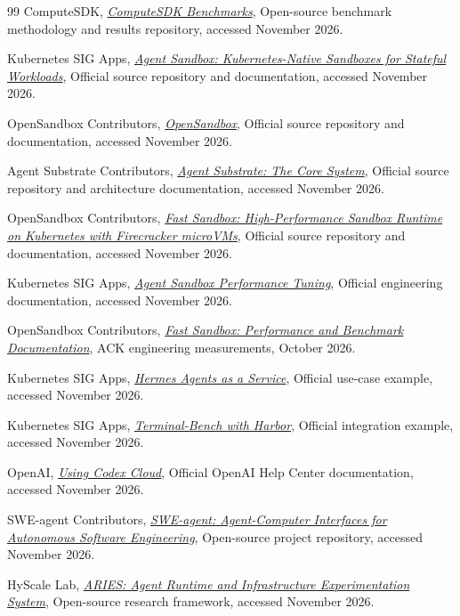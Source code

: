 \documentclass[
  a4paper,
]{article}
\begin{document}
\begin{thebibliography}{99}
ComputeSDK,
\emph{\href{https://github.com/computesdk/benchmarks}
{ComputeSDK Benchmarks}},
Open-source benchmark methodology and results repository,
accessed November 2026.

Kubernetes SIG Apps,
\emph{\href{https://github.com/kubernetes-sigs/agent-sandbox}
{Agent Sandbox: Kubernetes-Native Sandboxes for Stateful
Workloads}},
Official source repository and documentation,
accessed November 2026.

OpenSandbox Contributors,
\emph{\href{https://github.com/opensandbox-group/OpenSandbox}
{OpenSandbox}},
Official source repository and documentation,
accessed November 2026.

Agent Substrate Contributors,
\emph{\href{https://github.com/agent-substrate/substrate}
{Agent Substrate: The Core System}},
Official source repository and architecture documentation,
accessed November 2026.

OpenSandbox Contributors,
\emph{\href{https://github.com/opensandbox-group/fast-sandbox}
{Fast Sandbox: High-Performance Sandbox Runtime on Kubernetes
with Firecracker microVMs}},
Official source repository and documentation,
accessed November 2026.

Kubernetes SIG Apps,
\emph{\href{https://github.com/kubernetes-sigs/agent-sandbox/blob/main/docs/performance-tuning.md}
{Agent Sandbox Performance Tuning}},
Official engineering documentation,
accessed November 2026.

OpenSandbox Contributors,
\emph{\href{https://github.com/opensandbox-group/fast-sandbox}
{Fast Sandbox: Performance and Benchmark Documentation}},
ACK engineering measurements,
October 2026.

Kubernetes SIG Apps,
\emph{\href{https://agent-sandbox.sigs.k8s.io/docs/use-cases/examples/hermes-agents-as-a-service/}
{Hermes Agents as a Service}},
Official use-case example,
accessed November 2026.

Kubernetes SIG Apps,
\emph{\href{https://agent-sandbox.sigs.k8s.io/docs/use-cases/examples/harbor-terminal-bench/}
{Terminal-Bench with Harbor}},
Official integration example,
accessed November 2026.

OpenAI,
\emph{\href{https://help.openai.com/en/articles/20001545-using-codex-cloud}
{Using Codex Cloud}},
Official OpenAI Help Center documentation,
accessed November 2026.

SWE-agent Contributors,
\emph{\href{https://github.com/SWE-agent/SWE-agent}
{SWE-agent: Agent-Computer Interfaces for Autonomous
Software Engineering}},
Open-source project repository,
accessed November 2026.

HyScale Lab,
\emph{\href{https://github.com/hyscale-lab/ARIES}
{ARIES: Agent Runtime and Infrastructure Experimentation System}},
Open-source research framework,
accessed November 2026.

\end{thebibliography}
\end{document}
